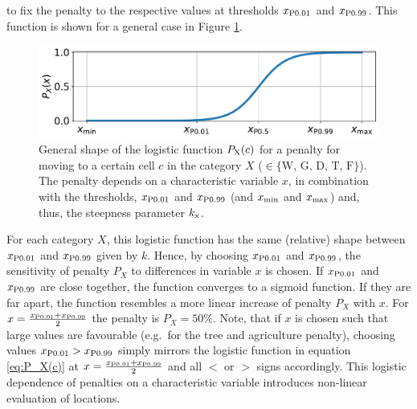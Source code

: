 to fix the penalty to the respective values at thresholds $x_{\rm P0.01}$ and $x_{\rm P0.99}$.
This function is shown for a general case in Figure \ref{fig:logF}.
\begin{figure}
	\centering
	\includegraphics[width=\textwidth]{images/general_logF.pdf}
	\caption{General shape of the logistic function $P_{\rm X}(c)$ for a penalty for moving to a certain cell $c$ in the category $X$ ($\in\{\text{W, G, D, T, F}\}$). The penalty depends on a characteristic variable $x$, in combination with the thresholds, $x_{\rm P0.01}$ and $x_{\rm P0.99}$ (and $x_{\rm min}$ and $x_{\rm max}$) and, thus, the steepness parameter $k_{\rm x}$.}
	\label{fig:logF}
\end{figure}
For each category $X$, this logistic function has the same (relative) shape between $x_{\rm P0.01}$ and $x_{\rm P0.99}$ given by $k$. 
Hence, by choosing $x_{\rm P0.01}$ and $x_{\rm P0.99}$, the sensitivity of penalty $P_X$ to differences in variable $x$ is chosen. 
If $x_{\rm P0.01}$ and $x_{\rm P0.99}$ are close together, the function converges to a sigmoid function. 
If they are far apart, the function resembles a more linear increase of penalty $P_X$ with $x$.
For $x=\frac{x_{\rm P0.01} + x_{\rm P0.99}}{2}$ the penalty is $P_X = 50\%$.
Note, that if $x$ is chosen such that large values are favourable (e.g.\ for the tree and agriculture penalty), choosing values $x_{\rm P0.01}>x_{\rm P0.99}$ simply mirrors the logistic function in equation \ref{eq:P_X(c)} at $x=\frac{x_{\rm P0.01}+x_{\rm P0.99}}{2}$ and all $<$ or $>$ signs accordingly.
This logistic dependence of penalties on a characteristic variable introduces non-linear evaluation of locations.


